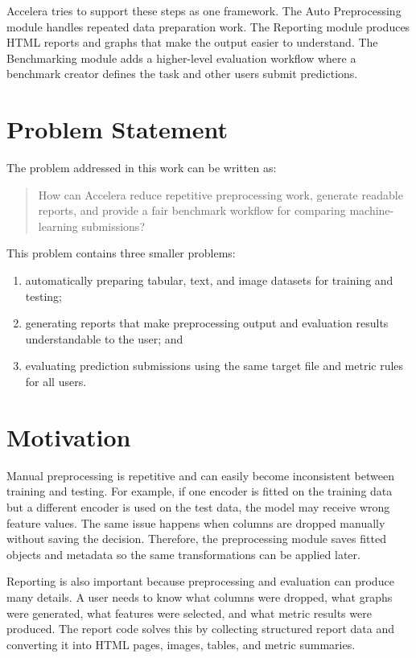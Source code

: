 \documentclass[12pt,a4paper,oneside]{report}
\newcommand{\systemname}{Accelera}
\begin{document}
\systemname{} tries to support these steps as one framework. The Auto
Preprocessing module handles repeated data preparation work. The Reporting
module produces HTML reports and graphs that make the output easier to
understand. The Benchmarking module adds a higher-level evaluation workflow
where a benchmark creator defines the task and other users submit predictions.

\section{Problem Statement}

The problem addressed in this work can be written as:

\begin{quote}
How can \systemname{} reduce repetitive preprocessing work, generate readable
reports, and provide a fair benchmark workflow for comparing machine-learning
submissions?
\end{quote}

This problem contains three smaller problems:

\begin{enumerate}[leftmargin=*]
  \item automatically preparing tabular, text, and image datasets for training
        and testing;
  \item generating reports that make preprocessing output and evaluation
        results understandable to the user; and
  \item evaluating prediction submissions using the same target file and metric
        rules for all users.
\end{enumerate}

\section{Motivation}

Manual preprocessing is repetitive and can easily become inconsistent between
training and testing. For example, if one encoder is fitted on the training
data but a different encoder is used on the test data, the model may receive
wrong feature values. The same issue happens when columns are dropped manually
without saving the decision. Therefore, the preprocessing module saves fitted
objects and metadata so the same transformations can be applied later.

Reporting is also important because preprocessing and evaluation can produce
many details. A user needs to know what columns were dropped, what graphs were
generated, what features were selected, and what metric results were produced.
The report code solves this by collecting structured report data and converting
it into HTML pages, images, tables, and metric summaries.
\end{document}
